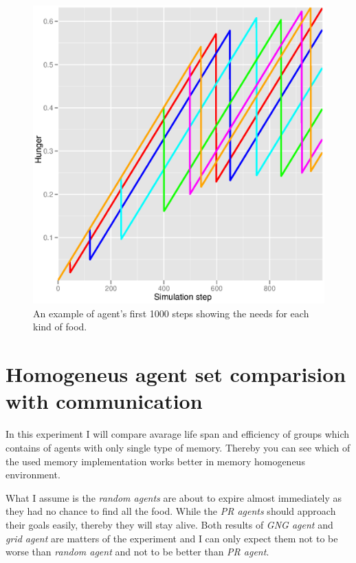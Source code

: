 \begin{figure}[h!]
  \centering                                
  \includegraphics[scale=0.4]{diagrams/experiments/single_agent.eps}    
  \caption{An example of agent's first 1000 steps showing the needs for each kind of food.}
  \label{experiments:singleagent}
\end{figure}



\section{Homogeneus agent set comparision with communication}

In this experiment I will compare avarage life span and efficiency of groups which contains of agents with only single type of memory. Thereby you can see which of the used memory implementation works better in memory homogeneus environment.

What I assume is the \emph{random agents} are about to expire almost immediately as they had no chance to find all the food. While the \emph{PR agents} should approach their goals easily, thereby they will stay alive. Both results of \emph{GNG agent} and \emph{grid agent} are matters of the experiment and I can only expect them not to be worse than \emph{random agent} and not to be better than \emph{PR agent}.     

